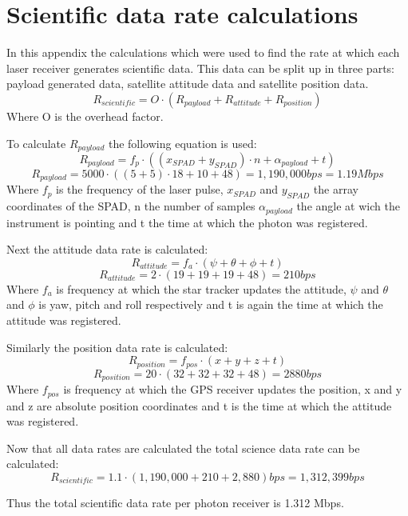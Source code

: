 \chapter{Scientific data rate calculations}
\label{scirate}
In this appendix the calculations which were used to find the rate at which each laser receiver generates scientific data.
This data can be split up in three parts: payload generated data, satellite attitude data and satellite position data.
\begin{equation}
R_{scientific}=O\cdot (R_{payload}+ R_{attitude} + R_{position})
\end{equation}
Where O is the overhead factor.

To calculate $R_{payload}$ the following equation is used:
\begin{equation}
R_{payload}=f_{p} \cdot ((x_{SPAD}+y_{SPAD})\cdot n+ \alpha_{payload}+t)
\end{equation}
\begin{equation}
R_{payload}=5000 \cdot ((5+5)\cdot 18+10+48)=1,190,000 bps=1.19 Mbps 
\end{equation}
Where $f_{p}$ is the frequency of the laser pulse, $x_{SPAD}$ and $y_{SPAD}$ the array coordinates of the SPAD, n the number of samples $\alpha_{payload}$ the angle at wich the instrument is pointing and t the time at which the photon was registered.

Next the attitude data rate is calculated:
\begin{equation}
R_{attitude}=f_{a} \cdot (\psi + \theta + \phi +t)
\end{equation}
\begin{equation}
R_{attitude}=2 \cdot (19+19+19+48)=210 bps 
\end{equation}
Where $f_{a}$ is frequency at which the star tracker updates the attitude, $\psi$ and $\theta$ and $\phi$ is yaw, pitch and roll respectively and t is again the time at which the attitude was registered.

Similarly the position data rate is calculated:
\begin{equation}
R_{position}=f_{pos} \cdot (x + y + z +t)
\end{equation}
\begin{equation}
R_{position}=20 \cdot (32+32+32+48)=2880 bps 
\end{equation}
Where $f_{pos}$ is frequency at which the GPS receiver updates the position, x and y and z are absolute position coordinates and t is the time at which the attitude was registered.

Now that all data rates are calculated the total science data rate can be calculated:
\begin{equation}
R_{scientific}=1.1\cdot (1,190,000 + 210 + 2,880) bps= 1,312,399 bps
\end{equation}

Thus the total scientific data rate per photon receiver is 1.312 Mbps.